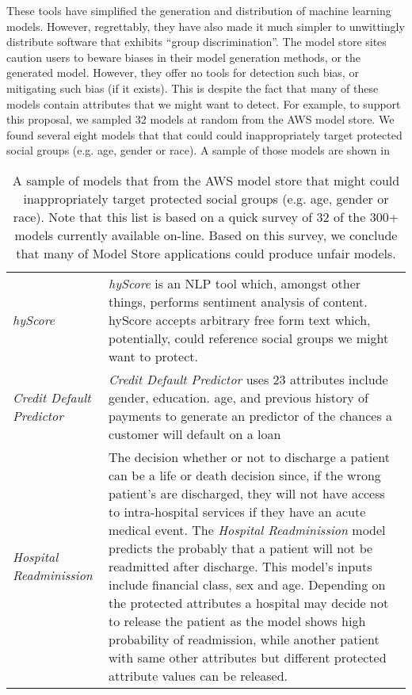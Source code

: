 These tools have simplified the generation and distribution of machine learning models.
However, regrettably, they have also made it much simpler to 
unwittingly  distribute  software that exhibits
``group discrimination''.  The model store sites caution
users to beware biases in their model generation methods, or the generated model. However, they offer no tools for detection   such bias, or mitigating such bias (if it exists). This is despite the fact
that many of these models contain attributes that we might want to detect.
For example, to support this proposal, we sampled 32 models at random from
the AWS model store. We found several eight models that  that could could inappropriately target protected social groups (e.g. age, gender or race). A sample of those models are shown in 

\begin{table}
\small
\begin{tabular}{|p{0.8in}|p{5.4in}|}\hline
\rowcolor{gray!20}
 {\em hyScore} & {\em hyScore} is an NLP tool which, amongst other things, performs  sentiment analysis of content. hyScore accepts arbitrary free form text which, potentially, could reference   social groups we might want to protect.
 \\ 
 {\em  Credit Default Predictor} &{\em Credit Default Predictor} uses   23 attributes include gender, education. age, and previous history of payments to generate an   predictor of the chances a customer will default on a loan
 \\
\rowcolor{gray!20}
{\em Hospital Readminission} &
The decision whether or not to discharge a patient can be a life or
death decision since, if the wrong patient's are discharged, they
will not have access to   intra-hospital services if they have an acute medical event. The {\em Hospital Readminission} model predicts the probably that a patient will not be readmitted after discharge. This model's inputs include financial class, sex and age. Depending on the protected attributes a hospital may decide not to release the patient as the model shows high probability of readmission, while another patient with same other attributes but different protected attribute values can be released.
\\
\hline
\end{tabular}
\caption{A sample of models that from the AWS model store
that might  could inappropriately target protected social groups (e.g. age, gender or race). Note that this list is based on a quick survey
of 32 of the 300+ models currently available on-line.
Based on this survey, we conclude that many of Model Store
applications could produce unfair models.}
\label{tbl:msample}
\end{table}


